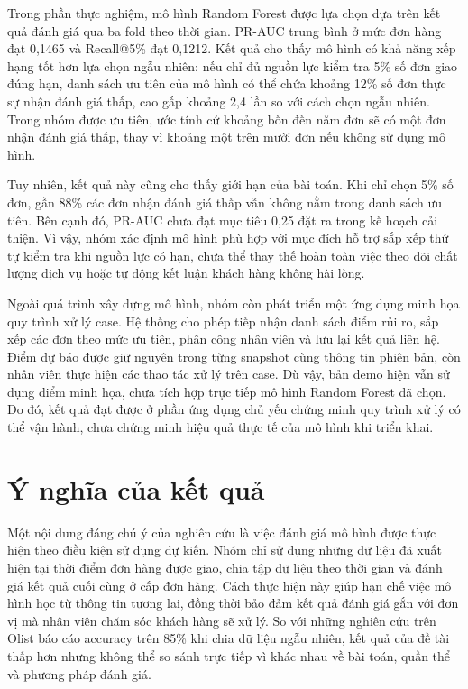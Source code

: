 \documentclass[12pt,a4paper]{report}
\begin{document}
Trong phần thực nghiệm, mô hình Random Forest được lựa chọn dựa trên kết quả đánh giá qua ba fold theo thời gian. PR-AUC trung bình ở mức đơn hàng đạt 0,1465 và Recall@5\% đạt 0,1212. Kết quả cho thấy mô hình có khả năng xếp hạng tốt hơn lựa chọn ngẫu nhiên: nếu chỉ đủ nguồn lực kiểm tra 5\% số đơn giao đúng hạn, danh sách ưu tiên của mô hình có thể chứa khoảng 12\% số đơn thực sự nhận đánh giá thấp, cao gấp khoảng 2,4 lần so với cách chọn ngẫu nhiên. Trong nhóm được ưu tiên, ước tính cứ khoảng bốn đến năm đơn sẽ có một đơn nhận đánh giá thấp, thay vì khoảng một trên mười đơn nếu không sử dụng mô hình.

Tuy nhiên, kết quả này cũng cho thấy giới hạn của bài toán. Khi chỉ chọn 5\% số đơn, gần 88\% các đơn nhận đánh giá thấp vẫn không nằm trong danh sách ưu tiên. Bên cạnh đó, PR-AUC chưa đạt mục tiêu 0,25 đặt ra trong kế hoạch cải thiện. Vì vậy, nhóm xác định mô hình phù hợp với mục đích hỗ trợ sắp xếp thứ tự kiểm tra khi nguồn lực có hạn, chưa thể thay thế hoàn toàn việc theo dõi chất lượng dịch vụ hoặc tự động kết luận khách hàng không hài lòng.

Ngoài quá trình xây dựng mô hình, nhóm còn phát triển một ứng dụng minh họa quy trình xử lý case. Hệ thống cho phép tiếp nhận danh sách điểm rủi ro, sắp xếp các đơn theo mức ưu tiên, phân công nhân viên và lưu lại kết quả liên hệ. Điểm dự báo được giữ nguyên trong từng snapshot cùng thông tin phiên bản, còn nhân viên thực hiện các thao tác xử lý trên case. Dù vậy, bản demo hiện vẫn sử dụng điểm minh họa, chưa tích hợp trực tiếp mô hình Random Forest đã chọn. Do đó, kết quả đạt được ở phần ứng dụng chủ yếu chứng minh quy trình xử lý có thể vận hành, chưa chứng minh hiệu quả thực tế của mô hình khi triển khai.

\section{Ý nghĩa của kết quả}

Một nội dung đáng chú ý của nghiên cứu là việc đánh giá mô hình được thực hiện theo điều kiện sử dụng dự kiến. Nhóm chỉ sử dụng những dữ liệu đã xuất hiện tại thời điểm đơn hàng được giao, chia tập dữ liệu theo thời gian và đánh giá kết quả cuối cùng ở cấp đơn hàng. Cách thực hiện này giúp hạn chế việc mô hình học từ thông tin tương lai, đồng thời bảo đảm kết quả đánh giá gắn với đơn vị mà nhân viên chăm sóc khách hàng sẽ xử lý. So với những nghiên cứu trên Olist báo cáo accuracy trên 85\% khi chia dữ liệu ngẫu nhiên, kết quả của đề tài thấp hơn nhưng không thể so sánh trực tiếp vì khác nhau về bài toán, quần thể và phương pháp đánh giá.
\end{document}
